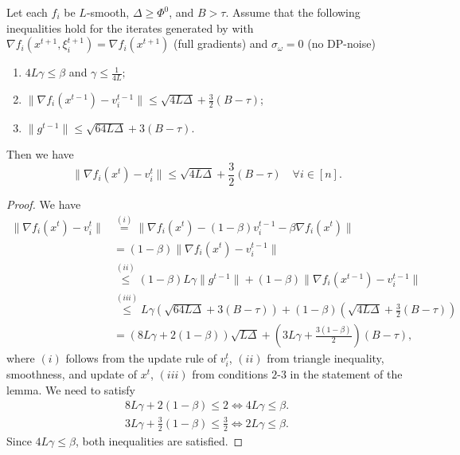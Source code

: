 \documentclass[a4paper,11pt]{article}
\begin{document}
\begin{lemma}\label{lem:bound_nablafxt_vt}
    Let each $f_i$ be $L$-smooth, $\Delta \ge \Phi^0$, and $B > \tau$. Assume that the following inequalities hold for the iterates generated by  with $\nabla f_i(x^{t+1},\xi^{t+1}_i) = \nabla f_i(x^{t+1})$ (full gradients) and $\sigma_{\omega} = 0$ (no DP-noise)
    \begin{enumerate}
        \item $4L\gamma \leq \beta$ and $\gamma \le \frac{1}{4L};$
        \item $\|\nabla f_i(x^{t-1}) - v_i^{t-1}\| \le \sqrt{4L\Delta} + \frac{3}{2}(B-\tau)$;
        \item $\|g^{t-1}\| \le \sqrt{64L\Delta}+3(B-\tau).$
    \end{enumerate}
    Then we have 
    \begin{equation}
        \|\nabla f_i(x^t)-v_i^t\| \le \sqrt{4L\Delta}+\frac{3}{2}(B-\tau) \quad \forall i\in[n].
    \end{equation}
\end{lemma}
\begin{proof}
    We have 
    \begin{align*}
        \|\nabla f_i(x^t)-v_i^t\| &\overset{(i)}{=} \|\nabla f_i(x^t) - (1-\beta)v_i^{t-1} - \beta\nabla f_i(x^t)\|\\
        &= (1-\beta)\|\nabla f_i(x^t) - v_i^{t-1}\|\\
        &\overset{(ii)}{\le} (1-\beta) L\gamma\|g^{t-1}\| 
        + (1-\beta)\|\nabla f_i(x^{t-1})-v_i^{t-1}\|\\
        &\overset{(iii)}{\le} L\gamma\left(\sqrt{64L\Delta} 
        + 3(B-\tau)\right)
        + (1-\beta)\left(\sqrt{4L\Delta} + \frac{3}{2}(B-\tau)\right)\\
        &= (8L\gamma + 2(1-\beta))\sqrt{L\Delta}
        + \left(3L\gamma + \frac{3(1-\beta)}{2}\right)(B-\tau),
    \end{align*}
    where $(i)$ follows from the update rule of $v_i^t$, $(ii)$ from triangle inequality, smoothness, and update of $x^t$, $(iii)$ from conditions $2$-$3$ in the statement of the lemma.  We need to satisfy 
    \begin{align*}
        8L\gamma + 2(1-\beta) \le 2 \Leftrightarrow 4L\gamma \le \beta.\\
        3L\gamma + \frac{3}{2}(1-\beta) \le \frac{3}{2} \Leftrightarrow 2L\gamma \le \beta.
    \end{align*}
    Since $4L\gamma \leq \beta$, both inequalities are satisfied.
\end{proof}
\end{document}
